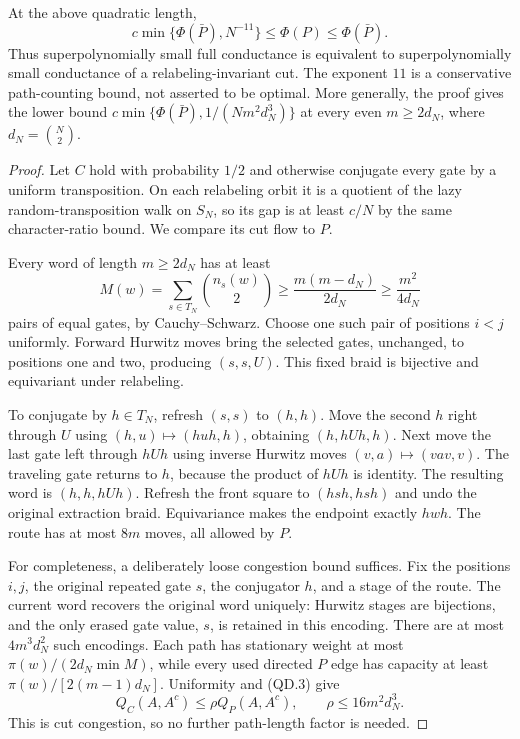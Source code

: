 \begin{theorem}
\label{thm:relabeling-reduction}
At the above quadratic length,
\[
 c\min\{\Phi(\bar P),N^{-11}\}
       \le\Phi(P)\le\Phi(\bar P).                 \tag{QD.2}
\]
Thus superpolynomially small full conductance is equivalent to
superpolynomially small conductance of a relabeling-invariant cut.
The exponent $11$ is a conservative path-counting bound, not asserted
to be optimal.  More generally, the proof gives the lower bound
$c\min\{\Phi(\bar P),1/(Nm^2d_N^3)\}$ at every even $m\ge2d_N$,
where $d_N=\binom N2$.
\end{theorem}
\begin{proof}
Let $C$ hold with probability $1/2$ and otherwise conjugate every gate
by a uniform transposition.  On each relabeling orbit it is a quotient
of the lazy random-transposition walk on $S_N$, so its gap is at least
$c/N$ by the same character-ratio bound.  We compare its cut flow to $P$.

Every word of length $m\ge2d_N$ has at least
\[
 M(w)=\sum_{s\in T_N}\binom{n_s(w)}2
 \ge\frac{m(m-d_N)}{2d_N}\ge\frac{m^2}{4d_N}        \tag{QD.3}
\]
pairs of equal gates, by Cauchy--Schwarz.  Choose one such pair of
positions $i<j$ uniformly.  Forward Hurwitz moves bring the selected
gates, unchanged, to positions one and two, producing $(s,s,U)$.
This fixed braid is bijective and equivariant under relabeling.

To conjugate by $h\in T_N$, refresh $(s,s)$ to $(h,h)$.
Move the second $h$ right through $U$ using
$(h,u)\mapsto(huh,h)$, obtaining $(h,hUh,h)$.
Next move the last gate left through $hUh$ using inverse Hurwitz moves
$(v,a)\mapsto(vav,v)$.  The traveling gate returns to $h$, because
the product of $hUh$ is identity.  The resulting word is $(h,h,hUh)$.
Refresh the front square to $(hsh,hsh)$ and undo the original extraction
braid.  Equivariance makes the endpoint exactly $hwh$.
The route has at most $8m$ moves, all allowed by $P$.

For completeness, a deliberately loose congestion bound suffices.
Fix the positions $i,j$, the original repeated gate $s$, the conjugator
$h$, and a stage of the route.  The current word recovers the original
word uniquely: Hurwitz stages are bijections, and the only erased gate
value, $s$, is retained in this encoding.  There are at most
$4m^3d_N^2$ such encodings.  Each path has stationary weight at most
$\pi(w)/(2d_N\min M)$, while every used directed $P$ edge has capacity
at least $\pi(w)/[2(m-1)d_N]$.  Uniformity and (QD.3) give
\[
 Q_C(A,A^c)\le\rho Q_P(A,A^c),\qquad
 \rho\le16m^2d_N^3.                                \tag{QD.4}
\]
This is cut congestion, so no further path-length factor is needed.


\end{proof}
